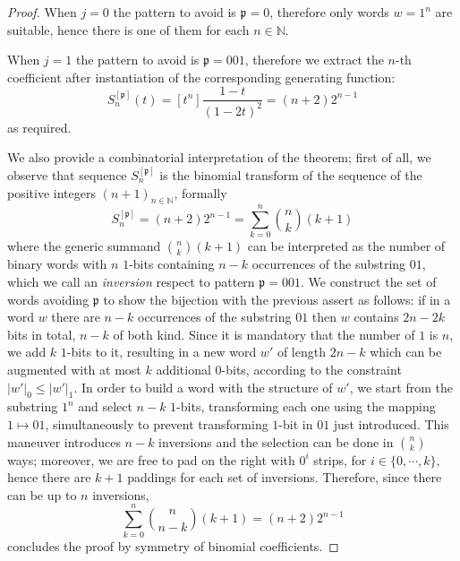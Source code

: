 \begin{proof}
When $j=0$ the pattern to avoid is $\mathfrak{p}=0$, therefore only words
$w = 1^{n}$ are suitable, hence there is one of them for each $n\in\mathbb{N}$.

When $j=1$ the pattern to avoid is $\mathfrak{p}=001$, therefore we
extract the $n$-th coefficient after instantiation of the corresponding
generating function:
\begin{displaymath}
[t^{n}] S_{n}^{[\mathfrak{p}]}(t) = [t^{n}]\frac{1-t}{(1-2t)^{2}} = (n+2)2^{n-1}
\end{displaymath}
as required.

We also provide a combinatorial interpretation of the theorem; first of all,
we observe that sequence $S_{n}^{[\mathfrak{p}]}$ is the binomial transform of
the sequence of the positive integers $(n+1)_{n\in\mathbb{N}}$, formally
\begin{displaymath}
    S_{n}^{[\mathfrak{p}]} =(n+2)2^{n-1}= \sum_{k=0}^{n}{{ {n}\choose{k}}(k+1)}
\end{displaymath}
where the generic summand ${{ {n}\choose{k}}(k+1)}$ can be interpreted as the number
of binary words with $n$ $1$-bits  containing $n-k$ occurrences of the substring $01$,
which we call an \emph{inversion} respect to pattern $\mathfrak{p}=001$. We construct the set of
words avoiding $\mathfrak{p}$ to show the bijection with the previous assert as follows:
if in a word $w$ there are $n-k$ occurrences of the substring $01$ then $w$ contains
$2n-2k$ bits in total, $n-k$ of both kind. Since it is mandatory that the number
of $1$ is $n$, we add $k$ $1$-bits  to it, resulting in a new word $w'$ of length $2n-k$
which can be augmented with at most $k$ additional $0$-bits,
according to the constraint $|w'|_{0}\leq |w'|_{1}$. In order to build a word with the structure of $w'$,
we start from the substring $1^{n}$ and select $n-k$ $1$-bits, transforming each one using
the mapping $1 \mapsto 01$, simultaneously to prevent transforming $1$-bit  in $01$ just introduced. This
maneuver introduces $n-k$ inversions and the selection can be done in ${{ {n}\choose{k}}}$ ways;
moreover, we are free to pad on the right with $0^{i}$ strips, for $i\in\lbrace 0,\cdots,k\rbrace,$
hence there are $k+1$ paddings for each set of inversions. Therefore, since there can be up to $n$ inversions,
\begin{displaymath}
    \sum_{k=0}^{n}{{ {n}\choose{n-k}}(k+1)} = (n+2)2^{n-1}
\end{displaymath}
concludes the proof by symmetry of binomial coefficients.
\end{proof}

